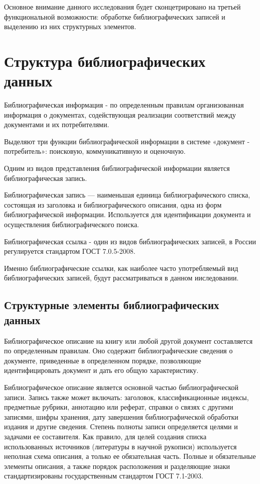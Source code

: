 Основное внимание данного исследования будет сконцетрировано на третьей функциональной возможности: обработке библиографических записей и выделению из них структурных элементов.

\section{Структура библиографических данных}

Библиографическая информация - по определенным правилам организованная информация о документах, содействующая реализации соответствий между документами и их потребителями.

Выделяют три функции библиографической информации в системе «документ - потребитель»: поисковую, коммуникативную и оценочную.

Одним из видов представления библиографической информации является библиографическая запись.

Библиографическая запись — наименьшая единица библиографического списка, состоящая из заголовка и библиографического описания, одна из форм библиографической информации. Используется для идентификации документа и осуществления библиографического поиска.

Библиографическая ссылка - один из видов библиографических записей, в России регулируется стандартом ГОСТ 7.0.5-2008.

Именно библиографические ссылки, как наиболее часто употребляемый вид библиографических записей, будут рассматриваться в данном ииследовании.

\subsection{Структурные элементы библиографических данных}
Библиографическое описание на книгу или любой другой документ составляется по определенным правилам. Оно содержит библиографические сведения о документе, приведенные в определенном порядке, позволяющие идентифицировать документ и дать его общую характеристику.

Библиографическое описание является основной частью библиографической записи. Запись также может включать: заголовок, классификационные индексы, предметные рубрики, аннотацию или реферат, справки о связях с другими записями, шифры хранения, дату завершения библиографической обработки издания и другие сведения. Степень полноты записи определяется целями и задачами ее составителя. Как правило, для целей создания списка использованных источников (литературы в научной рукописи) используется неполная схема описания, а только ее обязательная часть. Полные и обязательные элементы описания, а также порядок расположения и разделяющие знаки стандартизированы государственным стандартом ГОСТ 7.1-2003.

